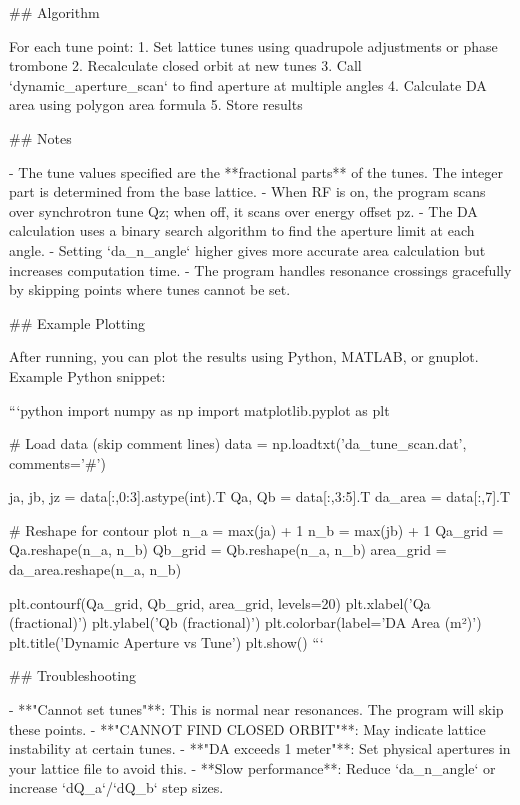 ## Algorithm

For each tune point:
1. Set lattice tunes using quadrupole adjustments or phase trombone
2. Recalculate closed orbit at new tunes
3. Call `dynamic_aperture_scan` to find aperture at multiple angles
4. Calculate DA area using polygon area formula
5. Store results

## Notes

- The tune values specified are the **fractional parts** of the tunes. The integer part is determined from the base lattice.
- When RF is on, the program scans over synchrotron tune Qz; when off, it scans over energy offset pz.
- The DA calculation uses a binary search algorithm to find the aperture limit at each angle.
- Setting `da_n_angle` higher gives more accurate area calculation but increases computation time.
- The program handles resonance crossings gracefully by skipping points where tunes cannot be set.

## Example Plotting

After running, you can plot the results using Python, MATLAB, or gnuplot. Example Python snippet:

```python
import numpy as np
import matplotlib.pyplot as plt

# Load data (skip comment lines)
data = np.loadtxt('da_tune_scan.dat', comments='#')

ja, jb, jz = data[:,0:3].astype(int).T
Qa, Qb = data[:,3:5].T
da_area = data[:,7].T

# Reshape for contour plot
n_a = max(ja) + 1
n_b = max(jb) + 1
Qa_grid = Qa.reshape(n_a, n_b)
Qb_grid = Qb.reshape(n_a, n_b)
area_grid = da_area.reshape(n_a, n_b)

plt.contourf(Qa_grid, Qb_grid, area_grid, levels=20)
plt.xlabel('Qa (fractional)')
plt.ylabel('Qb (fractional)')
plt.colorbar(label='DA Area (m²)')
plt.title('Dynamic Aperture vs Tune')
plt.show()
```

## Troubleshooting

- **"Cannot set tunes"**: This is normal near resonances. The program will skip these points.
- **"CANNOT FIND CLOSED ORBIT"**: May indicate lattice instability at certain tunes.
- **"DA exceeds 1 meter"**: Set physical apertures in your lattice file to avoid this.
- **Slow performance**: Reduce `da_n_angle` or increase `dQ_a`/`dQ_b` step sizes.
